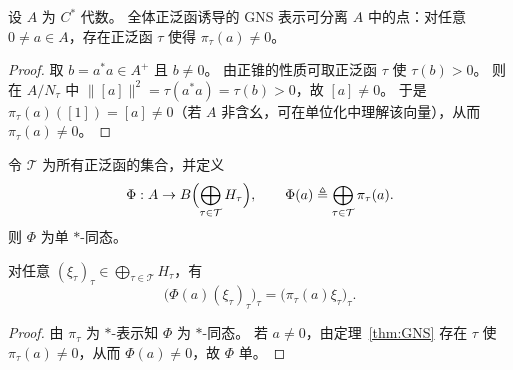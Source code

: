 \documentclass[lang=cn,a4paper,newtx,section]{elegantbook}
\begin{document}
\begin{theorem}\label{thm:GNS}
  设 $A$ 为 $C^{*}$ 代数。
  全体正泛函诱导的 GNS 表示可分离 $A$ 中的点：对任意 $0\ne a\in A$，存在正泛函 $\tau$ 使得 $\pi_{\tau}(a)\ne 0$。
\end{theorem}

\begin{proof}
  取 $b=a^{*}a\in A^{+}$ 且 $b\ne 0$。
  由正锥的性质可取正泛函 $\tau$ 使 $\tau(b)>0$。
  则在 $A/N_{\tau}$ 中 $\|[a]\|^{2}=\tau(a^{*}a)=\tau(b)>0$，故 $[a]\ne 0$。
  于是 $\pi_{\tau}(a)([1])=[a]\ne 0$（若 $A$ 非含幺，可在单位化中理解该向量），从而 $\pi_{\tau}(a)\ne 0$。
\end{proof}

\begin{corollary}
  令 $\mathcal{T}$ 为所有正泛函的集合，并定义
  \[
    \Phi:A\to B\Bigl(\bigoplus_{\tau\in\mathcal{T}} H_{\tau}\Bigr),\qquad
    \Phi(a)\triangleq\bigoplus_{\tau\in\mathcal{T}}\pi_{\tau}(a).
  \]
  则 $\Phi$ 为单 $*$-同态。
\end{corollary}

\begin{remark}
  对任意 $(\xi_{\tau})_{\tau}\in\bigoplus_{\tau\in\mathcal{T}} H_{\tau}$，有
  \[
    \bigl(\Phi(a)(\xi_{\tau})_{\tau}\bigr)_{\tau}=\bigl(\pi_{\tau}(a)\xi_{\tau}\bigr)_{\tau}.
  \]
\end{remark}

\begin{proof}
  由 $\pi_{\tau}$ 为 $*$-表示知 $\Phi$ 为 $*$-同态。
  若 $a\ne 0$，由定理~\ref{thm:GNS} 存在 $\tau$ 使 $\pi_{\tau}(a)\ne 0$，从而 $\Phi(a)\ne 0$，故 $\Phi$ 单。
\end{proof}
\end{document}

